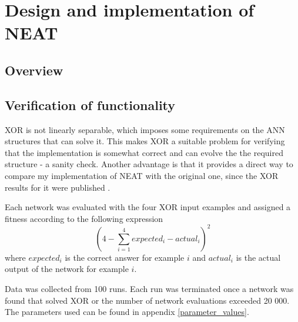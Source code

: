 \newpage

\section{Design and implementation of NEAT}

\subsection{Overview}

\subsection{Verification of functionality}
XOR is not linearly separable, which imposes some requirements on the ANN structures that can solve it.
This makes XOR a suitable problem for verifying that the implementation is somewhat correct and can evolve the
the required structure - a sanity check. Another advantage is that it provides a direct way to compare my
implementation of NEAT with the original one, since the XOR results for it were published \cite{neat_main}.

%

Each network was evaluated with the four XOR input examples and assigned a fitness according to the following expression
\begin{equation*} \label{eq:1}
    (4 - \sum_{i=1}^{4} expected_{i} - actual_{i})^2
\end{equation*}
where $expected_{i}$ is the correct answer for example $i$ and $actual_{i}$ is the actual output of the network for example $i$.

Data was collected from 100 runs. Each run was terminated once a network was found that solved
XOR or the number of network evaluations exceeded 20 000. The parameters used can be found in appendix \ref{parameter_values}.

